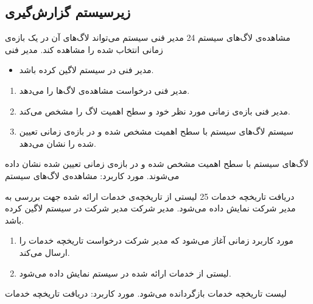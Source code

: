 \subsection{زیرسیستم گزارش‌گیری}




\usecase
{
	مشاهده‌ی لاگ‌های سیستم
}
{24}
{
مدیر فنی سیستم می‌تواند لاگ‌های آن در یک بازه‌ی زمانی انتخاب شده را مشاهده کند.
}
{
	مدیر فنی
}
{}
{
	\begin{itemize}
		\vspace*{-0.6cm}
		\item 
مدیر فنی در سیستم لاگین کرده باشد.
	\end{itemize}
}
{
	\vspace*{-0.6cm}
	\begin{enumerate}
		\item 
مدیر فنی درخواست مشاهده‌ی لاگ‌ها را می‌دهد.
		\item
		مدیر فنی بازه‌ی زمانی مورد نظر خود و سطح اهمیت لاگ را مشخص می‌کند.
		\item
		سیستم لاگ‌های سیستم با سطح اهمیت مشخص شده و در بازه‌ی زمانی تعیین شده را نشان می‌دهد.		
	\end{enumerate}
}
{
لاگ‌های سیستم با سطح اهمیت مشخص شده و در بازه‌ی زمانی تعیین شده نشان داده می‌شوند.
}
{
}
{
	مورد کاربرد: مشاهده‌ی لاگ‌های سیستم
}



\usecase
{دریافت تاریخچه خدمات}
{25}
{لیستی از تاریخچه‌ی خدمات ارائه شده جهت بررسی به مدیر شرکت نمایش داده می‌شود.}
{مدیر شرکت}
{}
{مدیر شرکت در سیستم لاگین کرده باشد.}
{
	\vspace*{-0.6cm}
	\begin{enumerate}
		\item مورد کاربرد زمانی آغاز می‌شود که مدیر شرکت درخواست تاریخچه خدمات را ارسال می‌کند.
		\item 
		لیستی از خدمات ارائه شده در سیستم نمایش داده می‌شود.
	\end{enumerate}
}
{لیست تاریخچه خدمات بازگردانده می‌شود.}
{
}
{
	مورد کاربرد: دریافت تاریخچه خدمات
}


